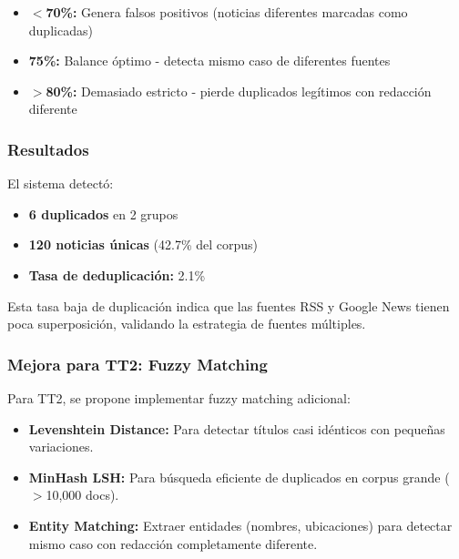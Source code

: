 \begin{itemize}
    \item \textbf{$<$70\%:} Genera falsos positivos (noticias diferentes marcadas como duplicadas)
    \item \textbf{75\%:} Balance óptimo - detecta mismo caso de diferentes fuentes
    \item \textbf{$>$80\%:} Demasiado estricto - pierde duplicados legítimos con redacción diferente
\end{itemize}

\subsubsection{Resultados}
\label{subsubsec:resultados_duplicados}

El sistema detectó:
\begin{itemize}
    \item \textbf{6 duplicados} en 2 grupos
    \item \textbf{120 noticias únicas} (42.7\% del corpus)
    \item \textbf{Tasa de deduplicación:} 2.1\%
\end{itemize}

Esta tasa baja de duplicación indica que las fuentes RSS y Google News tienen poca superposición, validando la estrategia de fuentes múltiples.

\subsubsection{Mejora para TT2: Fuzzy Matching}
\label{subsubsec:fuzzy_matching_tt2}

Para TT2, se propone implementar fuzzy matching adicional:

\begin{itemize}
    \item \textbf{Levenshtein Distance:} Para detectar títulos casi idénticos con pequeñas variaciones.
    \item \textbf{MinHash LSH:} Para búsqueda eficiente de duplicados en corpus grande ($>$10,000 docs).
    \item \textbf{Entity Matching:} Extraer entidades (nombres, ubicaciones) para detectar mismo caso con redacción completamente diferente.
\end{itemize}

